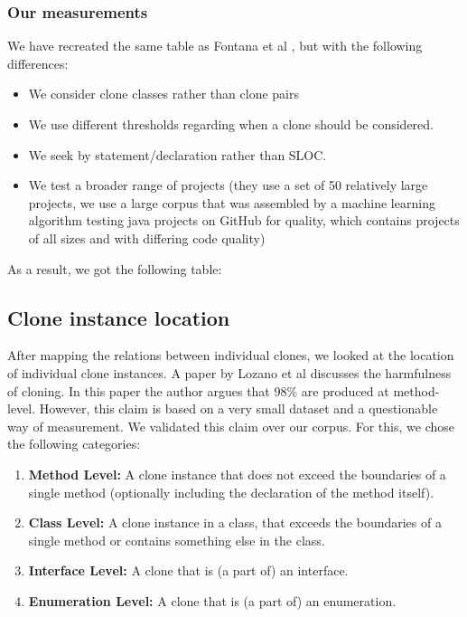 \documentclass[a4paper]{article}
\begin{document}
\subsubsection{Our measurements}
We have recreated the same table as Fontana et al \cite{fontana2015duplicated}, but with the following differences:
\begin{itemize}
  \item We consider clone classes rather than clone pairs
\item We use different thresholds regarding when a clone should be considered.
\item We seek by statement/declaration rather than SLOC.
\item We test a broader range of projects (they use a set of 50 relatively large projects, we use a large corpus that was assembled by a machine learning algorithm testing java projects on GitHub for quality, which contains projects of all sizes and with differing code quality)
\end{itemize}

As a result, we got the following table:


\subsection{Clone instance location}
After mapping the relations between individual clones, we looked at the location of individual clone instances. A paper by Lozano et al \cite{lozano2007evaluating} discusses the harmfulness of cloning. In this paper the author argues that 98\% are produced at method-level. However, this claim is based on a very small dataset and a questionable way of measurement. We validated this claim over our corpus. For this, we chose the following categories:
\begin{enumerate}
  \item \textbf{Method Level:} A clone instance that does not exceed the boundaries of a single method (optionally including the declaration of the method itself).
  \item \textbf{Class Level:} A clone instance in a class, that exceeds the boundaries of a single method or contains something else in the class.
  \item \textbf{Interface Level:} A clone that is (a part of) an interface.
  \item \textbf{Enumeration Level:} A clone that is (a part of) an enumeration.
\end{enumerate}
\end{document}

